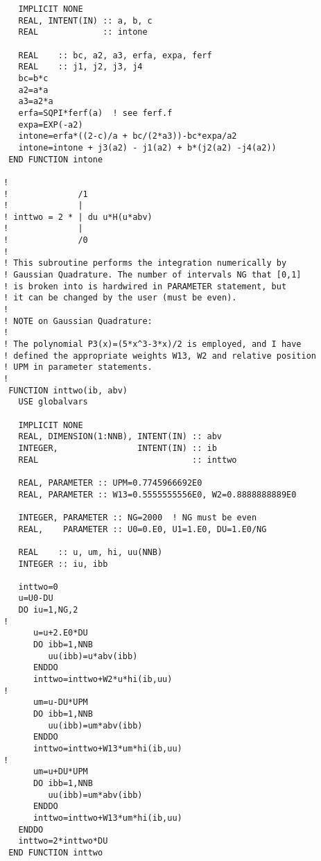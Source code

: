 \documentclass[preprint,12pt,eqsecnum,nofootinbib,amsmath,amssymb]{revtex4}
\begin{document}
{\begin{verbatim}
   IMPLICIT NONE
   REAL, INTENT(IN) :: a, b, c
   REAL             :: intone

   REAL    :: bc, a2, a3, erfa, expa, ferf
   REAL    :: j1, j2, j3, j4
   bc=b*c
   a2=a*a
   a3=a2*a
   erfa=SQPI*ferf(a)  ! see ferf.f
   expa=EXP(-a2)
   intone=erfa*((2-c)/a + bc/(2*a3))-bc*expa/a2
   intone=intone + j3(a2) - j1(a2) + b*(j2(a2) -j4(a2))
 END FUNCTION intone

!
!              /1
!              |
! inttwo = 2 * | du u*H(u*abv)
!              |
!              /0
!
! This subroutine performs the integration numerically by
! Gaussian Quadrature. The number of intervals NG that [0,1]
! is broken into is hardwired in PARAMETER statement, but 
! it can be changed by the user (must be even).
!
! NOTE on Gaussian Quadrature:
!
! The polynomial P3(x)=(5*x^3-3*x)/2 is employed, and I have
! defined the appropriate weights W13, W2 and relative position
! UPM in parameter statements. 
!
 FUNCTION inttwo(ib, abv)
   USE globalvars
    
   IMPLICIT NONE     
   REAL, DIMENSION(1:NNB), INTENT(IN) :: abv
   INTEGER,                INTENT(IN) :: ib
   REAL                               :: inttwo
   
   REAL, PARAMETER :: UPM=0.7745966692E0
   REAL, PARAMETER :: W13=0.5555555556E0, W2=0.8888888889E0
   
   INTEGER, PARAMETER :: NG=2000  ! NG must be even
   REAL,    PARAMETER :: U0=0.E0, U1=1.E0, DU=1.E0/NG
   
   REAL    :: u, um, hi, uu(NNB)
   INTEGER :: iu, ibb
   
   inttwo=0
   u=U0-DU
   DO iu=1,NG,2
!
      u=u+2.E0*DU
      DO ibb=1,NNB
         uu(ibb)=u*abv(ibb)
      ENDDO
      inttwo=inttwo+W2*u*hi(ib,uu)
!
      um=u-DU*UPM
      DO ibb=1,NNB
         uu(ibb)=um*abv(ibb)
      ENDDO
      inttwo=inttwo+W13*um*hi(ib,uu)
!
      um=u+DU*UPM
      DO ibb=1,NNB
         uu(ibb)=um*abv(ibb)
      ENDDO
      inttwo=inttwo+W13*um*hi(ib,uu)
   ENDDO
   inttwo=2*inttwo*DU
 END FUNCTION inttwo


\end{verbatim}}
\end{document}
